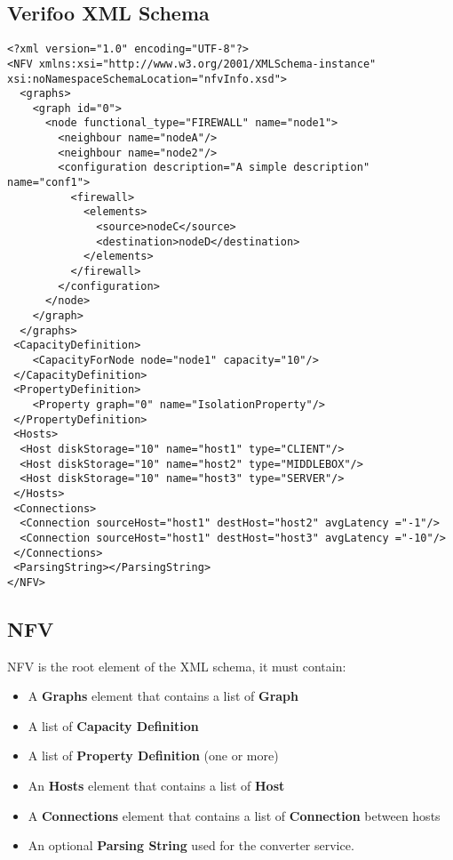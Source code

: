 \documentclass[a4paper,11pt]{article}
\begin{document}
\subsection{Verifoo XML Schema}
\lstset{language=XML}
\begin{lstlisting}[label={list:first},caption=XML Example]
<?xml version="1.0" encoding="UTF-8"?>
<NFV xmlns:xsi="http://www.w3.org/2001/XMLSchema-instance" xsi:noNamespaceSchemaLocation="nfvInfo.xsd">
  <graphs>
    <graph id="0">
      <node functional_type="FIREWALL" name="node1">
        <neighbour name="nodeA"/>
        <neighbour name="node2"/>
        <configuration description="A simple description" name="conf1">
          <firewall>
            <elements>
              <source>nodeC</source>
              <destination>nodeD</destination>
            </elements>
          </firewall>
        </configuration>
      </node>
    </graph>
  </graphs>
 <CapacityDefinition>
   	<CapacityForNode node="node1" capacity="10"/>
 </CapacityDefinition>
 <PropertyDefinition>
  	<Property graph="0" name="IsolationProperty"/> 		
 </PropertyDefinition>
 <Hosts>
  <Host diskStorage="10" name="host1" type="CLIENT"/>
  <Host diskStorage="10" name="host2" type="MIDDLEBOX"/>
  <Host diskStorage="10" name="host3" type="SERVER"/>
 </Hosts>
 <Connections>
  <Connection sourceHost="host1" destHost="host2" avgLatency ="-1"/>
  <Connection sourceHost="host1" destHost="host3" avgLatency ="-10"/>
 </Connections>
 <ParsingString></ParsingString>
</NFV>
\end{lstlisting}
\newpage
\subsection*{NFV}
NFV is the root element of the XML schema, it must contain: 
\begin{itemize}
    \item A \textbf{Graphs} element that contains a list of \textbf{Graph}
    \item A list of \textbf{Capacity Definition}
    \item A list of \textbf{Property Definition} (one or more)
    \item An \textbf{Hosts} element that contains a list of \textbf{Host}
    \item A \textbf{Connections} element that contains a list of \textbf{Connection} between hosts
    \item An optional \textbf{Parsing String} used for the converter service.
\end{itemize}
\end{document}
